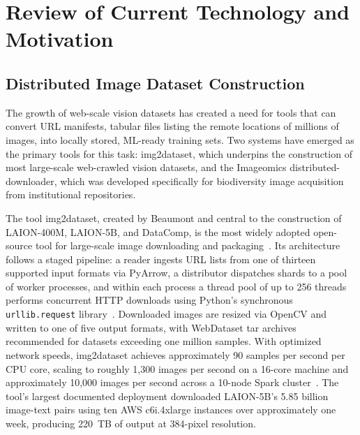 \documentclass[11pt, letterpaper]{article}
\begin{document}
\section{Review of Current Technology and Motivation}

\subsection{Distributed Image Dataset Construction}

The growth of web-scale vision datasets has created a need for tools that can
convert URL manifests, tabular files listing the remote locations of millions
of images, into locally stored, ML-ready training sets. Two systems have
emerged as the primary tools for this task: img2dataset, which underpins the
construction of most large-scale web-crawled vision datasets, and the Imageomics
distributed-downloader, which was developed specifically for biodiversity image
acquisition from institutional repositories.

The tool img2dataset, created by Beaumont and central to the construction of LAION-400M,
LAION-5B, and DataComp, is the most widely adopted open-source tool for
large-scale image downloading and
packaging~\cite{schuhmann2022laion5b,beaumont_img2dataset}. Its architecture
follows a staged pipeline: a reader ingests URL lists from one of thirteen
supported input formats via PyArrow, a distributor dispatches shards to a pool
of worker processes, and within each process a thread pool of up to 256 threads
performs concurrent HTTP downloads using Python's synchronous
\texttt{urllib.request} library~\cite{beaumont_img2dataset}. Downloaded images
are resized via OpenCV and written to one of five output formats, with
WebDataset tar archives recommended for datasets exceeding one million samples. With optimized network speeds, img2dataset achieves approximately 90 samples per second per CPU core, scaling
to roughly 1,300 images per second on a 16-core machine and approximately
10,000 images per second across a 10-node Spark
cluster~\cite{schuhmann2022laion5b}. The tool's largest documented deployment
downloaded LAION-5B's 5.85 billion image-text pairs using ten AWS c6i.4xlarge
instances over approximately one week, producing 220~TB of output at 384-pixel
resolution.
\end{document}
